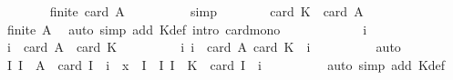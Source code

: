 \begin{isabellebody}
\ \ \ \ \ \ \isamarkupfalse%
\ {\isachardoublequoteopen}finite\ {\isacharbraceleft}{\kern0pt}{}{\isachardot}{\kern0pt}{\isachardot}{\kern0pt}card\ A{\isacharbraceright}{\kern0pt}{\isachardoublequoteclose}\isanewline
\ \ \ \ \ \ \ \ \isamarkupfalse%
\ simp\isanewline
\ \ \ \ \ \ \isamarkupfalse%
\ {\isachardoublequoteopen}{\isacharbraceleft}{\kern0pt}{}{\isachardot}{\kern0pt}{\isachardot}{\kern0pt}card\ K{\isacharbraceright}{\kern0pt}\ {\isasymsubseteq}\ {\isacharbraceleft}{\kern0pt}{}{\isachardot}{\kern0pt}{\isachardot}{\kern0pt}card\ A{\isacharbraceright}{\kern0pt}{\isachardoublequoteclose}\isanewline
\ \ \ \ \ \ \ \ \isamarkupfalse%
\ {\isacartoucheopen}finite\ A{\isacartoucheclose}\ \isamarkupfalse%
\ {\isacharparenleft}{\kern0pt}auto\ simp\ add{\isacharcolon}{\kern0pt}\ K{\isacharunderscore}{\kern0pt}def\ intro{\isacharcolon}{\kern0pt}\ card{\isacharunderscore}{\kern0pt}mono{\isacharparenright}{\kern0pt}\isanewline
\ \ \ \ \isamarkupfalse%
\isanewline
\ \ \ \ \ \ \isamarkupfalse%
\ i\isanewline
\ \ \ \ \ \ \isamarkupfalse%
\ {\isachardoublequoteopen}i\ {\isasymin}\ {\isacharbraceleft}{\kern0pt}{}{\isachardot}{\kern0pt}{\isachardot}{\kern0pt}card\ A{\isacharbraceright}{\kern0pt}\ {\isacharminus}{\kern0pt}\ {\isacharbraceleft}{\kern0pt}{}{\isachardot}{\kern0pt}{\isachardot}{\kern0pt}card\ K{\isacharbraceright}{\kern0pt}{\isachardoublequoteclose}\isanewline
\ \ \ \ \ \ \isamarkupfalse%
\ \isamarkupfalse%
\ i{\isacharcolon}{\kern0pt}\ {\isachardoublequoteopen}i\ {\isasymle}\ card\ A{\isachardoublequoteclose}\ {\isachardoublequoteopen}card\ K\ {\isacharless}{\kern0pt}\ i{\isachardoublequoteclose}\isanewline
\ \ \ \ \ \ \ \ \isamarkupfalse%
\ auto\isanewline
\ \ \ \ \ \ \isamarkupfalse%
\ {\isachardoublequoteopen}{\isacharbraceleft}{\kern0pt}I{\isachardot}{\kern0pt}\ I\ {\isasymsubseteq}\ A\ {\isasymand}\ card\ I\ {\isacharequal}{\kern0pt}\ i\ {\isasymand}\ x\ {\isasymin}\ {\isasymInter}I{\isacharbraceright}{\kern0pt}\ {\isacharequal}{\kern0pt}\ {\isacharbraceleft}{\kern0pt}I{\isachardot}{\kern0pt}\ I\ {\isasymsubseteq}\ K\ {\isasymand}\ card\ I\ {\isacharequal}{\kern0pt}\ i{\isacharbraceright}{\kern0pt}{\isachardoublequoteclose}\isanewline
\ \ \ \ \ \ \ \ \isamarkupfalse%
\ {\isacharparenleft}{\kern0pt}auto\ simp\ add{\isacharcolon}{\kern0pt}\ K{\isacharunderscore}{\kern0pt}def{\isacharparenright}{\kern0pt}\isanewline

\end{isabellebody}
